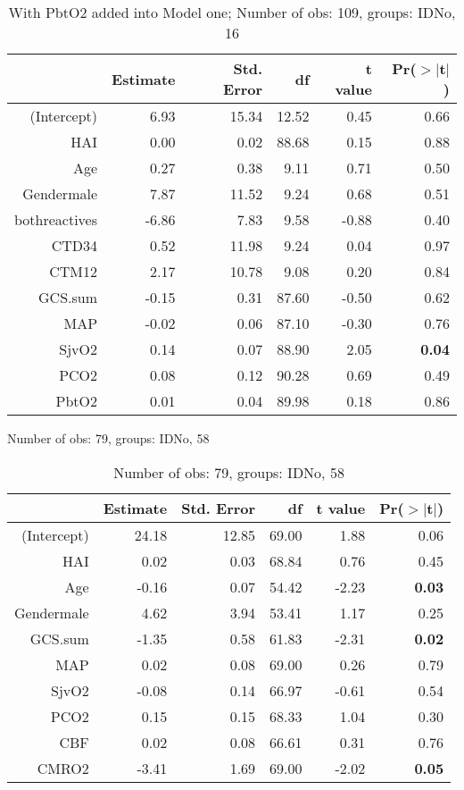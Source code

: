 \documentclass{article}
\begin{document}
\begin{table}[H]
\centering
\begin{tabular}{rrrrrr}
  \hline
 & Estimate & Std. Error & df & t value & Pr($>$$|$t$|$) \\ 
  \hline
(Intercept) & 6.93 & 15.34 & 12.52 & 0.45 & 0.66 \\ 
  HAI & 0.00 & 0.02 & 88.68 & 0.15 & 0.88 \\ 
  Age & 0.27 & 0.38 & 9.11 & 0.71 & 0.50 \\ 
  Gendermale & 7.87 & 11.52 & 9.24 & 0.68 & 0.51 \\ 
  bothreactives & -6.86 & 7.83 & 9.58 & -0.88 & 0.40 \\ 
  CTD34 & 0.52 & 11.98 & 9.24 & 0.04 & 0.97 \\ 
  CTM12 & 2.17 & 10.78 & 9.08 & 0.20 & 0.84 \\ 
  GCS.sum & -0.15 & 0.31 & 87.60 & -0.50 & 0.62 \\ 
  MAP & -0.02 & 0.06 & 87.10 & -0.30 & 0.76 \\ 
  SjvO2 & 0.14 & 0.07 & 88.90 & 2.05 & {\bf 0.04} \\ 
  PCO2 & 0.08 & 0.12 & 90.28 & 0.69 & 0.49 \\ 
  PbtO2 & 0.01 & 0.04 & 89.98 & 0.18 & 0.86 \\ 
   \hline
\end{tabular}
\caption{With PbtO2 added into Model one; Number of obs: 109, groups: IDNo, 16}
\label{tab: lmm2}
\end{table}


\begin{table}[H]
\centering
\caption{Number of obs: 79, groups: IDNo, 58}
\begin{tabular}{rrrrrr}
  \hline
 & Estimate & Std. Error & df & t value & Pr($>$$|$t$|$) \\ 
  \hline
(Intercept) & 24.18 & 12.85 & 69.00 & 1.88 & 0.06 \\ 
  HAI & 0.02 & 0.03 & 68.84 & 0.76 & 0.45 \\ 
  Age & -0.16 & 0.07 & 54.42 & -2.23 & {\bf 0.03} \\ 
  Gendermale & 4.62 & 3.94 & 53.41 & 1.17 & 0.25 \\ 
  GCS.sum & -1.35 & 0.58 & 61.83 & -2.31 & {\bf 0.02} \\ 
  MAP & 0.02 & 0.08 & 69.00 & 0.26 & 0.79 \\ 
  SjvO2 & -0.08 & 0.14 & 66.97 & -0.61 & 0.54 \\ 
  PCO2 & 0.15 & 0.15 & 68.33 & 1.04 & 0.30 \\ 
  CBF & 0.02 & 0.08 & 66.61 & 0.31 & 0.76 \\ 
  CMRO2 & -3.41 & 1.69 & 69.00 & -2.02 & {\bf 0.05} \\ 
   \hline
\end{tabular}
\caption{Number of obs: 79, groups: IDNo, 58}
\label{tab: lmm3}
\end{table}
\end{document}

